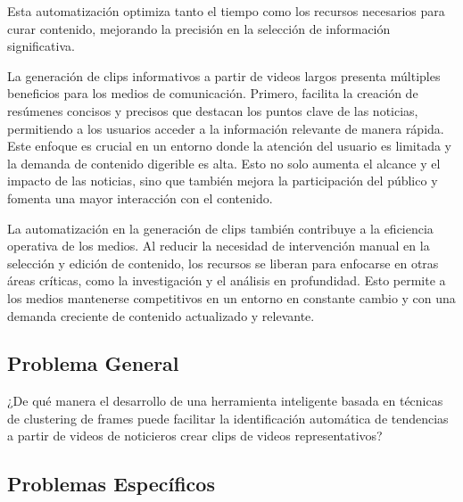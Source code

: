 Esta automatización optimiza tanto el tiempo como los recursos necesarios para curar contenido, mejorando la precisión en la selección de información significativa.

La generación de clips informativos a partir de videos largos presenta múltiples beneficios para los medios de comunicación. Primero, facilita la creación de resúmenes concisos y precisos que destacan los puntos clave de las noticias, permitiendo a los usuarios acceder a la información relevante de manera rápida. Este enfoque es crucial en un entorno donde la atención del usuario es limitada y la demanda de contenido digerible es alta.
Esto no solo aumenta el alcance y el impacto de las noticias, sino que también mejora la participación del público y fomenta una mayor interacción con el contenido.

La automatización en la generación de clips también contribuye a la eficiencia operativa de los medios. Al reducir la necesidad de intervención manual en la selección y edición de contenido, los recursos se liberan para enfocarse en otras áreas críticas, como la investigación y el análisis en profundidad. Esto permite a los medios mantenerse competitivos en un entorno en constante cambio y con una demanda creciente de contenido actualizado y relevante.


\subsection{Problema General}
\newcommand{\ProblemaGeneral}{
	¿De qué manera el desarrollo de una herramienta inteligente basada en técnicas de clustering de frames puede facilitar la identificación automática de tendencias a partir de videos de noticieros crear clips de videos representativos?}
\ProblemaGeneral
\subsection{Problemas Espec\'{i}ficos}
\newcommand{\Pbone}{¿Cómo obtener de manera eficiente los videos de noticieros de un día en específico, asegurando que sean representativos de los eventos más importantes del día?}
\newcommand{\Pbtwo}{¿Qué técnicas de preprocesamiento de imágenes y normalización son más efectivas para mejorar la calidad y relevancia de los frames extraídos de los videos?}
\newcommand{\Pbthree}{¿Qué técnicas de extracción de características permiten representar adecuadamente los frames para identificar patrones visuales relevantes?}
\newcommand{\Pbfour}{¿Cuál es el algoritmo de clustering más adecuado para agrupar los frames en base a las similitudes de las características extraídas que posean entre ellas?}
\newcommand{\Pbfive}{¿Cómo generar clips informativos concisos, asegurando que reflejen los eventos clave discutidos en los noticieros?}

